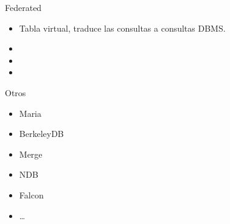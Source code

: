 \begin{frame}{Federated}
  \begin{itemize}
    \item Tabla virtual, traduce las consultas a consultas DBMS.
    \item 
    \item 
    \item 
  \end{itemize}
\end{frame}

\begin{frame}{Otros}
  \begin{itemize}
    \item Maria
    \item BerkeleyDB
    \item Merge
    \item NDB
    \item Falcon
    \item \dots
  \end{itemize}
\end{frame}
